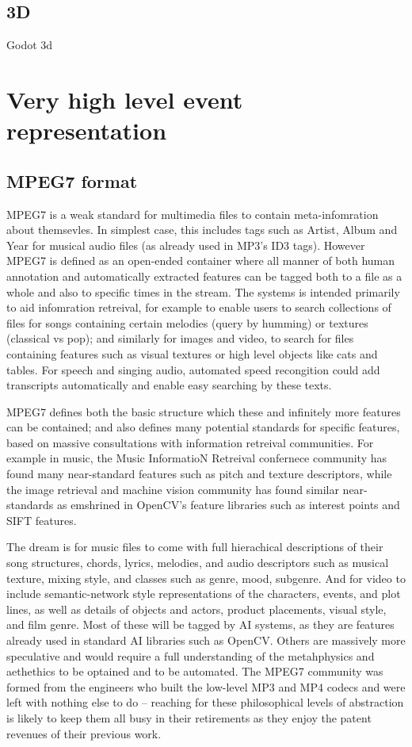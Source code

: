 \documentclass[oneside,english]{scrbook}
\begin{document}
\section{3D}
Godot 3d


\chapter{Very high level event representation}

\section{MPEG7 format}

MPEG7 is a weak standard for multimedia files to contain meta-infomration about themsevles.  In simplest case, this includes tags such as Artist, Album and Year for musical audio files (as already used in MP3's ID3 tags).  However MPEG7 is defined as an open-ended container where all manner of both human annotation and automatically extracted features can be tagged both to a file as a whole and also to specific times in the stream.  The systems is intended primarily to aid infomration retreival, for example to enable users to search collections of files for songs containing certain melodies (query by humming) or textures (classical vs pop); and similarly for images and video, to search for files containing features such as visual textures or high level objects like cats and tables.   For speech and singing audio, automated speed recongition could add transcripts automatically and enable easy searching by these texts.

MPEG7 defines both the basic structure which these and infinitely more features can be contained; and also defines many potential standards for specific features, based on massive consultations with information retreival communities.   For example in music, the Music InformatioN Retreival confernece community has found many near-standard features such as pitch and texture descriptors, while the image retrieval and machine vision community has found similar near-standards as emshrined in OpenCV's feature libraries such as interest points and SIFT features.

The dream is for music files to come with full hierachical descriptions of their song structures, chords, lyrics, melodies, and audio descriptors such as musical texture, mixing style, and classes such as genre, mood, subgenre.   And for video to include semantic-network style representations of the characters, events, and plot lines, as well as details of objects and actors, product placements, visual style, and film genre.  Most of these will be tagged by AI systems, as they are features already used in standard AI libraries such as OpenCV.   Others are massively more speculative and would require a full understanding of the metahphysics and aethethics to be optained and to be automated.   The MPEG7 community was formed from the engineers who built the low-level MP3 and MP4 codecs and were left with nothing else to do -- reaching for these philosophical levels of abstraction is likely to keep them all busy in their retirements as they enjoy the patent revenues of their previous work.
\end{document}

